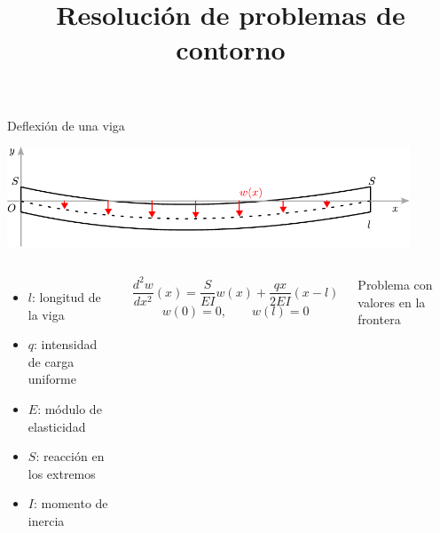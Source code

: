 \documentclass[9pt, aspectratio=169]{beamer}
\title{Resolución de problemas de contorno}
\subtitle{}
\begin{document}
\maketitle

\begin{frame}{Deflexión de una viga}
\begin{center}
  \includegraphics[width=0.9\textwidth]{figs/viga.pdf}
\end{center}
\begin{columns}[]
    \begin{itemize}
       \item  $l$: longitud de la viga
       \item $q$: intensidad de carga uniforme
       \item $E$: módulo de elasticidad
       \item $S$: reacción en los extremos
       \item $I$: momento de inercia
    \end{itemize}
    \pause
    \[ \frac{d^2 w}{dx^{2}}(x) = \frac{S}{EI}w(x) + \frac{q x}{2 E I}(x - l) \]
    \[ w(0) = 0, \qquad w(l) = 0 \]

    \begin{center} \alert{Problema con valores en la frontera} \end{center}
    
\end{columns}
\end{frame}
\end{document}
